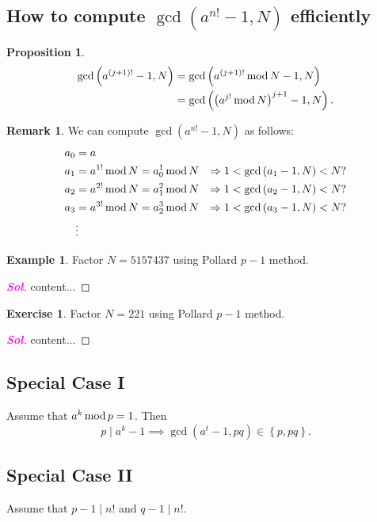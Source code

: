 \documentclass[12pt,openany]{book}
\newtheorem{proposition}[theorem]{Proposition}
\theoremstyle{definition}
\newtheorem{remark}{Remark}[chapter]
\newtheorem{exercise}{Exercise}[chapter]
\newtheorem{example}{Example}[chapter]
\newcommand{\set}[1]{\left\{#1\right\}}
\newcommand{\of}[1]{\left( #1 \right)}
\newcommand{\sol}{\textcolor{magenta}{\bf Sol}}
\renewcommand{\mod}{\operatorname{\textnormal{mod}}}
\begin{document}
	\subsection{How to compute $\gcd\of{a^{n!}-1,N}$ efficiently}
	
	\begin{tcolorbox}[colback=white,colframe=procolor,arc=5pt,title={\color{white}\bf Existence of the Multiple of $p-1$}]
		\begin{proposition}
			\begin{align*}
			\gcd\of{a^{\of{j+1}!}-1,N}&=\gcd\of{a^{\of{j+1}!}\mod N-1,N}\\
			&=\gcd\of{\of{a^{j!}\mod N}^{j+1}-1,N}.
			\end{align*}
		\end{proposition}
	\end{tcolorbox}
	\begin{remark}
		We can compute $\gcd\of{a^{n!}-1,N}$ as follows: \begin{align*}
		a_0&=a&\\
		a_1&=a^{1!}\mod N=a_0^1\mod N&\Rightarrow 1<\gcd\of{a_1-1,N}<N?\\
		a_2&=a^{2!}\mod N=a_1^2\mod N&\Rightarrow 1<\gcd\of{a_2-1,N}<N?\\
		a_3&=a^{3!}\mod N=a_2^3\mod N&\Rightarrow 1<\gcd\of{a_3-1,N}<N?\\
		&\vdots &
		\end{align*}
	\end{remark}
	\vspace{8pt}
	\begin{example}
		Factor $N=5157437$ using Pollard $p-1$ method.\begin{proof}[\sol]
			content...
		\end{proof}
	\end{example}
	
	
	\begin{exercise}
		Factor $N=221$ using Pollard $p-1$ method.\begin{proof}[\sol]
			content...
		\end{proof}
	\end{exercise}
	
	\subsection{Special Case I}
	Assume that $a^k\mod p = 1$. Then \[
	p\mid a^k-1\implies \gcd\of{a^t-1,pq}\in\set{p,pq}.
	\]
	
	
	\subsection{Special Case II}
	Assume that $p-1\mid n!$ and $q-1\mid n!$.
	
\end{document}
